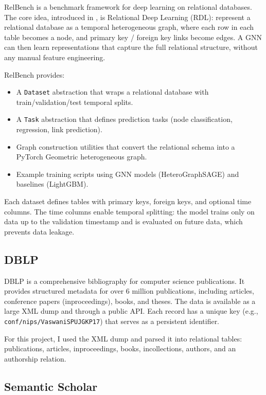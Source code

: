 \documentclass{article}
\begin{document}
RelBench \citep{robinson2024relbench} is a benchmark framework for deep learning on relational databases.
The core idea, introduced in \citet{fey2024relational}, is Relational Deep Learning (RDL): represent a relational database as a temporal heterogeneous graph, where each row in each table becomes a node, and primary key / foreign key links become edges.
A GNN can then learn representations that capture the full relational structure, without any manual feature engineering.

RelBench provides:
\begin{itemize}
    \item A \texttt{Dataset} abstraction that wraps a relational database with train/validation/test temporal splits.
    \item A \texttt{Task} abstraction that defines prediction tasks (node classification, regression, link prediction).
    \item Graph construction utilities that convert the relational schema into a PyTorch Geometric heterogeneous graph.
    \item Example training scripts using GNN models (HeteroGraphSAGE) and baselines (LightGBM).
\end{itemize}

Each dataset defines tables with primary keys, foreign keys, and optional time columns.
The time columns enable temporal splitting: the model trains only on data up to the validation timestamp and is evaluated on future data, which prevents data leakage.

\subsection{DBLP}

DBLP \citep{ley2009dblp} is a comprehensive bibliography for computer science publications.
It provides structured metadata for over 6 million publications, including articles, conference papers (inproceedings), books, and theses.
The data is available as a large XML dump and through a public API.
Each record has a unique key (e.g., \texttt{conf/nips/VaswaniSPUJGKP17}) that serves as a persistent identifier.

For this project, I used the XML dump and parsed it into relational tables: publications, articles, inproceedings, books, incollections, authors, and an authorship relation.

\subsection{Semantic Scholar}
\end{document}
